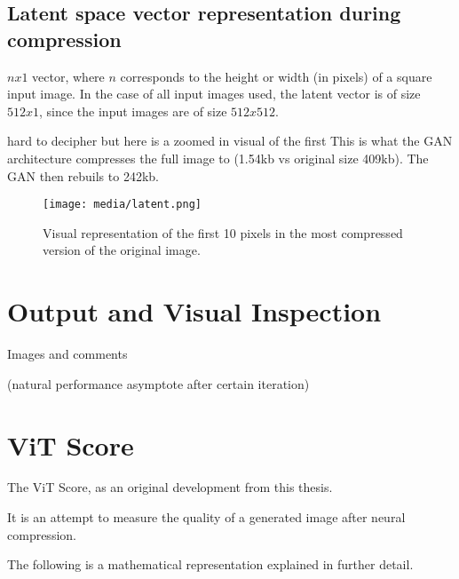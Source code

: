 



\subsection{Latent space vector representation during compression}

$nx1$ vector, where $n$ corresponds to the height or width (in pixels)
of a square input image. In the case of all input images used, the latent vector
is of size $512x1$, since the input images are of size $512x512$.

hard to decipher but here is a zoomed in visual of the first
This is what the GAN architecture compresses the full image to (1.54kb vs original size 409kb).
The GAN then rebuils to 242kb.


\begin{figure}[H]
	\begin{center}
	\texttt{[image: media/latent.png]}
	\end{center}
	\caption[Latent Space Representation]{Visual representation of the first 10 pixels in the most compressed version of the original image.}
	\end{figure}

\section{Output and Visual Inspection}
Images and comments

(natural performance asymptote after certain iteration)

\section{ViT Score}

The ViT Score, as an original development from this thesis. 

It is an attempt to measure the quality of a generated image after neural compression.

The following is a mathematical representation explained in further detail.

